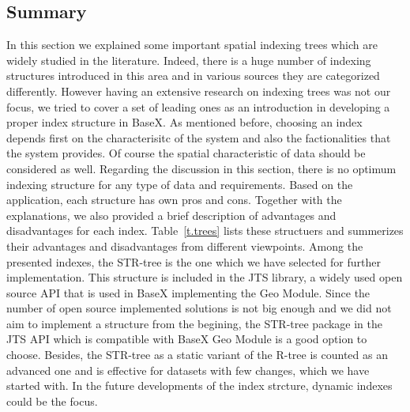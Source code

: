 \documentclass[a4paper,12pt]{article}
\begin{document}
\subsection{Summary}
In this section we explained some important spatial indexing trees which are widely studied in the literature. Indeed, there is a huge number of indexing structures introduced in this area and in various sources they are categorized differently. However having an extensive research on indexing trees was not our focus, we tried to cover a set of leading ones as an introduction in developing a proper index structure in BaseX. As mentioned before, choosing an index depends first on the characterisitc of the system and also the factionalities that the system provides. Of course the spatial characteristic of data should be considered as well. 
Regarding the discussion in this section, there is no optimum indexing structure for any type of data and requirements. Based on the application, each structure has own pros and cons. Together with the explanations, we also provided a brief description of advantages and disadvantages for each index. %
Table~\ref{t.trees} lists these structuers and summerizes their advantages and disadvantages from different viewpoints. 
Among the presented indexes, the STR-tree is the one which we have selected for further implementation. 
This structure is included in the JTS library, a widely used open source API that is used in BaseX implementing the Geo Module. Since the number of open source implemented solutions is not big enough and we did not aim to implement a structure from the begining, the STR-tree package in the JTS API which is compatible with BaseX Geo Module is a good option to choose. Besides, the STR-tree as a static variant of the R-tree is counted as an advanced one and is effective for datasets with few changes, which we have started with. In the future developments of the index strcture, dynamic indexes could be the focus.
\end{document}
